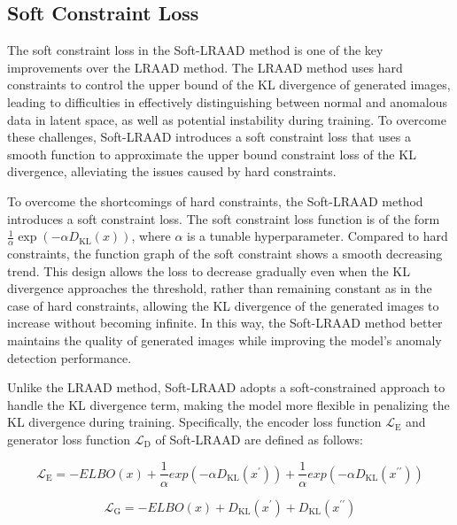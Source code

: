 \documentclass{article}
\begin{document}
\subsection{Soft Constraint Loss}

The soft constraint loss in the Soft-LRAAD method is one of the key improvements over the LRAAD method. The LRAAD method uses hard constraints to control the upper bound of the KL divergence of generated images, leading to difficulties in effectively distinguishing between normal and anomalous data in latent space, as well as potential instability during training. To overcome these challenges, Soft-LRAAD introduces a soft constraint loss that uses a smooth function to approximate the upper bound constraint loss of the KL divergence, alleviating the issues caused by hard constraints.

To overcome the shortcomings of hard constraints, the Soft-LRAAD method introduces a soft constraint loss. The soft constraint loss function is of the form $\frac{1}{\alpha}\exp(- \alpha D_{\mathrm{KL}}(x))$, where $\alpha$ is a tunable hyperparameter. Compared to hard constraints, the function graph of the soft constraint shows a smooth decreasing trend. This design allows the loss to decrease gradually even when the KL divergence approaches the threshold, rather than remaining constant as in the case of hard constraints, allowing the KL divergence of the generated images to increase without becoming infinite. In this way, the Soft-LRAAD method better maintains the quality of generated images while improving the model's anomaly detection performance.

Unlike the LRAAD method, Soft-LRAAD adopts a soft-constrained approach to handle the KL divergence term, making the model more flexible in penalizing the KL divergence during training. Specifically, the encoder loss function $\mathcal{L}_{\mathrm{E}}$ and generator loss function $\mathcal{L}_{\mathrm{D}}$ of Soft-LRAAD are defined as follows:

\begin{equation}
  \mathcal{L}_{\mathrm{E}}=-ELBO(x) + \frac{1}{\alpha}exp(- \alpha D_{\mathrm{KL}}(x^\prime)) + \frac{1}{\alpha}exp(-\alpha D_{\mathrm{KL}}(x^{\prime\prime}))
\end{equation}

\begin{equation}
  \mathcal{L}_{\text {G}}=-ELBO(x) + D_\mathrm{KL}(x^\prime) + D_\mathrm{KL}(x^{\prime\prime})
\end{equation}
\end{document}
